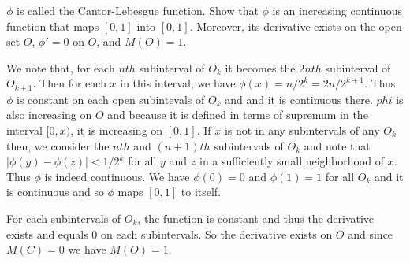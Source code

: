 \documentclass[12pt]{article}
\begin{document}
\begin{enumerate}
    $\phi$ is called the Cantor-Lebesgue function. Show that $\phi$ is an increasing continuous function that maps $[0,1]$ into $[0,1]$. Moreover, its derivative exists on the open set $O$, $\phi' = 0$ on $O$, and $M(O) = 1$. 
    \begin{mybox}
        We note that, for each $nth$ subinterval of $O_k$
        it becomes the $2nth$ subinterval of $O_{k+1}$.
        Then for each $x$ in this interval, we have
        $\phi(x)=n/2^k=2n/2^{k+1}$. Thus $\phi$ is
        constant on each open subintevals of $O_k$ and
        and it is continuous there. $phi$ is also
        increasing on $O$ and because it is defined in
        terms of supremum in the interval $[0,x)$, it
        is increasing on $[0,1]$. If $x$ is not in
        any subintervals of any $O_k$ then,
        we consider the $nth$ and $(n+1)th$ subintervals
        of $O_k$ and note that $|\phi(y)-\phi(z)|<1/2^k$
        for all $y$ and $z$ in a sufficiently small
        neighborhood of $x$. Thus $\phi$ is indeed
        continuous. We have $\phi(0)=0$ and $\phi(1)=
        1$ for all $O_k$ and it is continuous and so $\phi$ maps $[0,1]$ to
        itself.

        \vspace*{2mm}
        For each subintervals of $O_k$, the function is
        constant and thus the derivative exists and
        equals 0 on each subintervals. So the derivative
        exists on $O$ and since $M(C)=0$ we have $M(O)=1$.
    \end{mybox}
    
\end{enumerate}
\end{document}
